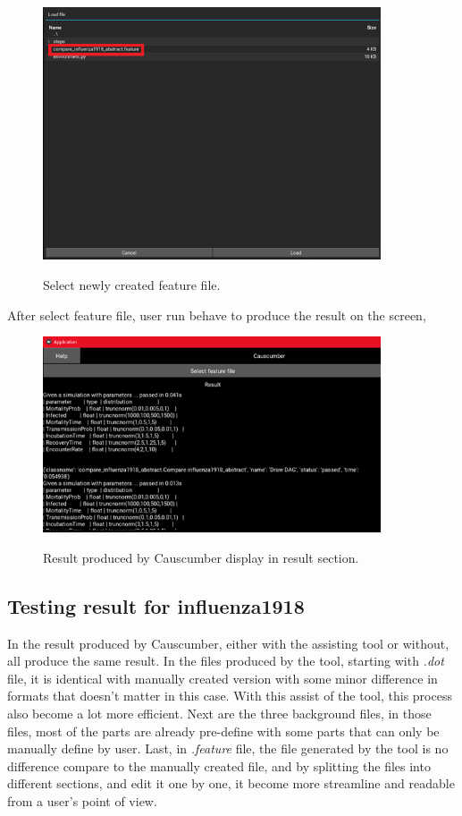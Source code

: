 \begin{figure}[H]
	\centering
	\includegraphics[width=10cm]{figures/influenzaTestProcess14.png}\\
	\caption{Select newly created feature file.}
	\label{fig:figure32}
\end{figure}
After select feature file, user run behave to produce the result on the screen,
\begin{figure}[H]
	\centering
	\includegraphics[width=10cm]{figures/influenzaTestProcess15.png}\\
	\caption{Result produced by Causcumber display in result section.}
	\label{fig:figure33}
\end{figure}

\subsection{Testing result for influenza1918}
In the result produced by Causcumber, either with the assisting tool or without, all produce the same result. In the files produced by the tool, starting with \textsl{.dot} file, it is identical with manually created version with some minor difference in formats that doesn’t matter in this case. With this assist of the tool, this process also become a lot more efficient. Next are the three background files, in those files, most of the parts are already pre-define with some parts that can only be manually define by user. Last, in \textsl{.feature} file, the file generated by the tool is no difference compare to the manually created file, and by splitting the files into different sections, and edit it one by one, it become more streamline and readable from a user’s point of view. 
